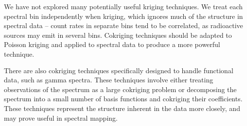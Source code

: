 We have not explored many potentially useful kriging techniques. We treat each
spectral bin independently when kriging, which ignores much of the structure in
spectral data -- count rates in separate bins tend to be correlated, as
radioactive sources may emit in several bins. Cokriging techniques should be
adapted to Poisson kriging and applied to spectral data to produce a more
powerful technique.

There are also cokriging techniques specifically designed to handle functional
data, such as gamma spectra.\cite{Nerini:2010ba,Giraldo:2010jx} These techniques
involve either treating observations of the spectrum as a large cokriging
problem or decomposing the spectrum into a small number of basis functions and
cokriging their coefficients. These techniques represent the structure inherent
in the data more closely, and may prove useful in spectral mapping.
